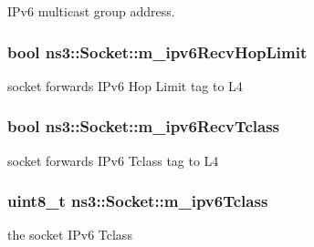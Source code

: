 I\+Pv6 multicast group address. 

\subsubsection[{\texorpdfstring{m\+\_\+ipv6\+Recv\+Hop\+Limit}{m_ipv6RecvHopLimit}}]{\setlength{\rightskip}{0pt plus 5cm}bool ns3\+::\+Socket\+::m\+\_\+ipv6\+Recv\+Hop\+Limit\hspace{0.3cm}{\ttfamily [private]}}\hypertarget{classns3_1_1Socket_a12d3f85537c5d62bfec29fb7d021a010}{}\label{classns3_1_1Socket_a12d3f85537c5d62bfec29fb7d021a010}


socket forwards I\+Pv6 Hop Limit tag to L4 

\subsubsection[{\texorpdfstring{m\+\_\+ipv6\+Recv\+Tclass}{m_ipv6RecvTclass}}]{\setlength{\rightskip}{0pt plus 5cm}bool ns3\+::\+Socket\+::m\+\_\+ipv6\+Recv\+Tclass\hspace{0.3cm}{\ttfamily [private]}}\hypertarget{classns3_1_1Socket_a904b460d94a02efd910ca16099bef919}{}\label{classns3_1_1Socket_a904b460d94a02efd910ca16099bef919}


socket forwards I\+Pv6 Tclass tag to L4 

\subsubsection[{\texorpdfstring{m\+\_\+ipv6\+Tclass}{m_ipv6Tclass}}]{\setlength{\rightskip}{0pt plus 5cm}uint8\+\_\+t ns3\+::\+Socket\+::m\+\_\+ipv6\+Tclass\hspace{0.3cm}{\ttfamily [private]}}\hypertarget{classns3_1_1Socket_a755c5e4c6e00489d2c0643cf05727899}{}\label{classns3_1_1Socket_a755c5e4c6e00489d2c0643cf05727899}


the socket I\+Pv6 Tclass 

